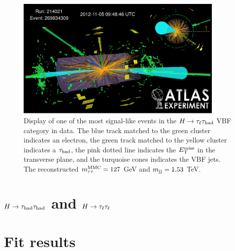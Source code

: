 \clearpage

\begin{figure}[tp]
  \centering
  \includegraphics[width=0.90\textwidth]{figures/HIGG-2013-32/figaux_19}
  \caption{Display of one of the most signal-like events in the $H\rightarrow\tau_\ell\tau_\text{had}$ VBF category in data. The blue track matched to the green cluster indicates an electron, the green track matched to the yellow cluster indicates a $\tau_\text{had}$, the pink dotted line indicates the $E_{\mathrm{T}}^{\mathrm{miss}}$ in the transverse plane, and the turquoise cones indicates the VBF jets. The reconstructed $m_{\tau\tau}^\text{MMC} = 127$ GeV and $m_{\text{jj}} = 1.53$ TeV.}
  \label{fig:results-eventdisplay}
\end{figure}

\section{$H\rightarrow\tau_\text{had}\tau_\text{had}$ and $H\rightarrow\tau_\ell\tau_\ell$}
\label{sec:results-hhll}

\section{Fit results}
\label{sec:results-fit}

\clearpage

